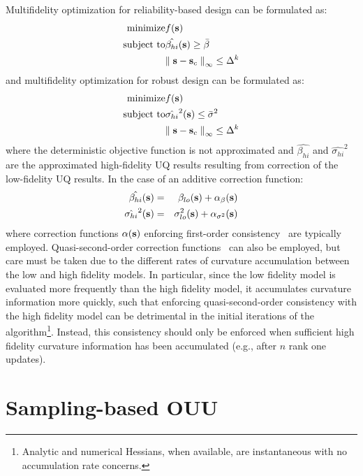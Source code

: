 Multifidelity optimization for reliability-based design can be
formulated as:
\begin{eqnarray}
  {\rm minimize }     & f({\bf s}) \nonumber \\
  {\rm subject \ to } & \hat{\beta_{hi}}({\bf s}) \ge \bar{\beta} \\
& {\parallel {\bf s} - {\bf s}_c \parallel}_\infty \le \Delta^k \nonumber
\label{eq:rbdo_mf}
\end{eqnarray}
and multifidelity optimization for robust design can be formulated as:
\begin{eqnarray}
  {\rm minimize }     & f({\bf s}) \nonumber \\
  {\rm subject \ to } & \hat{\sigma_{hi}}^2({\bf s}) \le \bar{\sigma}^2 \\
& {\parallel {\bf s} - {\bf s}_c \parallel}_\infty \le \Delta^k \nonumber
\label{eq:rdo_mf}
\end{eqnarray}
where the deterministic objective function is not approximated and 
$\hat{\beta_{hi}}$ and $\hat{\sigma_{hi}}^2$ are the approximated
high-fidelity UQ results resulting from correction of the low-fidelity 
UQ results.  In the case of an additive correction function:
\begin{eqnarray}
\hat{\beta_{hi}}({\bf s})    &=& \beta_{lo}({\bf s}) + 
\alpha_{\beta}({\bf s})  \label{eq:corr_lf_beta} \\
\hat{\sigma_{hi}}^2({\bf s}) &=& \sigma_{lo}^2({\bf s}) + 
\alpha_{\sigma^2}({\bf s}) \label{eq:corr_lf_sigma}
\end{eqnarray}
where correction functions $\alpha({\bf s})$ enforcing first-order
consistency~\cite{Eld04} are typically employed.  Quasi-second-order
correction functions~\cite{Eld04} can also be employed, but care
must be taken due to the different rates of curvature accumulation
between the low and high fidelity models.  In particular, since the
low fidelity model is evaluated more frequently than the high fidelity
model, it accumulates curvature information more quickly, such that
enforcing quasi-second-order consistency with the high fidelity model
can be detrimental in the initial iterations of the
algorithm\footnote{Analytic and numerical Hessians, when
available, are instantaneous with no accumulation rate concerns.}.
Instead, this consistency should only be enforced when sufficient high
fidelity curvature information has been accumulated (e.g., after $n$
rank one updates).



\section{Sampling-based OUU}\label{ouu:sampling}

